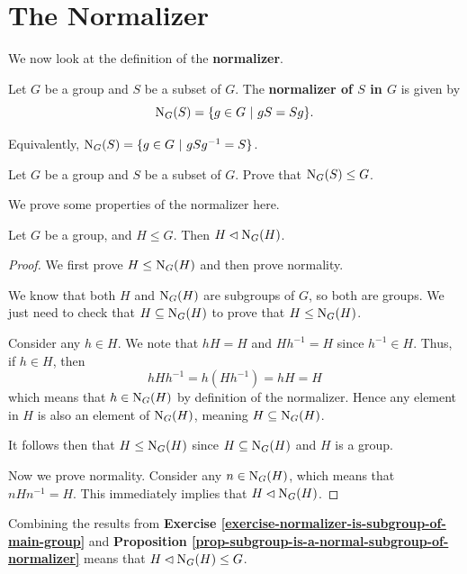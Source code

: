 \newpage

\section{The Normalizer}
We now look at the definition of the \textbf{normalizer}.
\begin{definition}
    Let $G$ be a group and $S$ be a subset of $G$. The \textbf{normalizer of $S$ in $G$} is given by
    \[
        \mathrm{N}_{G}(S) = \{g \in G \ | \  gS = Sg \}.
    \]
\end{definition}
\begin{remark}
    Equivalently, $\mathrm{N}_{G}(S) = \{g \in G \ | \  gSg^{-1} = S \}$.
\end{remark}
\begin{exercise}\label{exercise-normalizer-is-subgroup-of-main-group}
    Let $G$ be a group and $S$ be a subset of $G$. Prove that $\mathrm{N}_{G}(S) \leq G$.
\end{exercise}

We prove some properties of the normalizer here.
\begin{proposition}\label{prop-subgroup-is-a-normal-subgroup-of-normalizer}
    Let $G$ be a group, and $H \leq G$. Then $H \lhd \mathrm{N}_{G}(H)$.
\end{proposition}
\begin{proof}
    We first prove $H \leq \mathrm{N}_{G}(H)$ and then prove normality.

    We know that both $H$ and $\mathrm{N}_{G}(H)$ are subgroups of $G$, so both are groups. We just need to check that $H \subseteq \mathrm{N}_{G}(H)$ to prove that $H \leq \mathrm{N}_{G}(H)$.

    Consider any $h \in H$. We note that $hH = H$ and $Hh^{-1} = H$ since $h^{-1} \in H$. Thus, if $h \in H$, then
    \[
        hHh^{-1} = h(Hh^{-1}) = hH = H
    \]
    which means that $h \in \mathrm{N}_{G}(H)$ by definition of the normalizer. Hence any element in $H$ is also an element of $\mathrm{N}_{G}(H)$, meaning $H \subseteq \mathrm{N}_{G}(H)$.

    It follows then that $H \leq \mathrm{N}_{G}(H)$ since $H \subseteq \mathrm{N}_{G}(H)$ and $H$ is a group.

    Now we prove normality. Consider any $n \in \mathrm{N}_{G}(H)$, which means that $nHn^{-1} = H$. This immediately implies that $H \lhd \mathrm{N}_{G}(H)$.
\end{proof}
\begin{remark}
    Combining the results from \textbf{Exercise \ref{exercise-normalizer-is-subgroup-of-main-group}} and \textbf{Proposition \ref{prop-subgroup-is-a-normal-subgroup-of-normalizer}} means that $H \lhd \mathrm{N}_{G}(H) \leq G$.
\end{remark}

